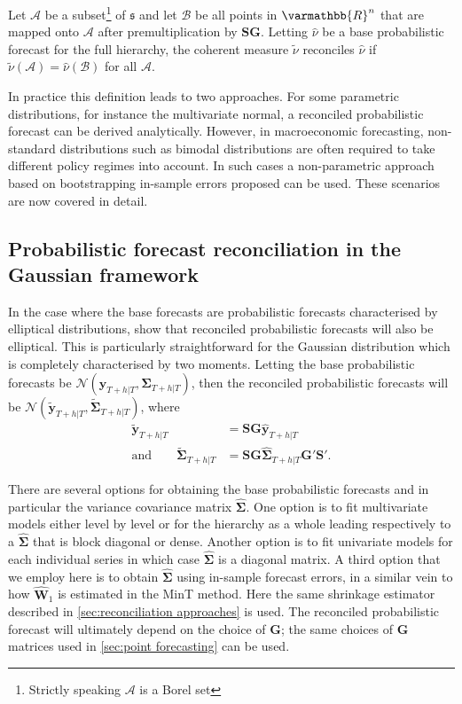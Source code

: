 {\begin{definition} Let $\mathcal{A}$ be a subset\footnote{Strictly speaking $\mathcal{A}$ is a Borel set} of $\mathfrak{s}$ and let $\mathcal{B}$ be all points in $\varmathbb{R}^n$ that are mapped onto $\mathcal{A}$ after premultiplication by $\bm{S}\bm{G}$. Letting $\hat{\nu}$ be a base probabilistic forecast for the full hierarchy, the coherent measure $\tilde{\nu}$ reconciles $\hat{\nu}$ if $\tilde{\nu}(\mathcal{A})=\hat{\nu}(\mathcal{B})$ for all $\mathcal{A}$.
\end{definition}

In practice this definition leads to two approaches. For some parametric distributions, for instance the multivariate normal, a reconciled probabilistic forecast can be derived analytically. However, in macroeconomic forecasting, non-standard distributions such as bimodal distributions are often required to take different policy regimes into account. In such cases a non-parametric approach based on bootstrapping in-sample errors proposed \citet{GamEtAl2018} can be used. These scenarios are now covered in detail.

\subsection{Probabilistic forecast reconciliation in the Gaussian framework}\label{sec:probrecgauss}

In the case where the base forecasts are probabilistic forecasts characterised by elliptical distributions, \citet{GamEtAl2018} show that reconciled probabilistic forecasts will also be elliptical. This is particularly straightforward for the Gaussian distribution which is completely characterised by two moments. Letting the base probabilistic forecasts be $\mathscr{N}(\bm{\hat{y}}_{T+h|T}, \hat{\bm{\Sigma}}_{T+h|T})$, then the reconciled probabilistic forecasts will be $\mathscr{N}(\bm{\tilde{y}}_{T+h|T}, \tilde{\bm{\Sigma}}_{T+h|T})$, where
\begin{align}\label{eq:rec mean}
	\bm{\tilde{y}}_{T+h|T} &= \bm{S}\bm{G}\bm{\hat{y}}_{T+h|T} \\
\text{and}\qquad\label{eq:rec var}
	\tilde{\bm{\Sigma}}_{T+h|T} &= \bm{S}\bm{G}\hat{\bm{\Sigma}}_{T+h|T}\bm{G}'\bm{S}'.
\end{align}

There are several options for obtaining the base probabilistic forecasts and in particular the variance covariance matrix $\hat{\bm{\Sigma}}$. One option is to fit multivariate models either level by level or for the hierarchy as a whole leading respectively to a $\hat{\bm \Sigma}$ that is block diagonal or dense. Another option is to fit univariate models for each individual series in which case $\hat{\bm{\Sigma}}$ is a diagonal matrix. A third option that we employ here is to obtain $\hat{\bm{\Sigma}}$ using in-sample forecast errors, in a similar vein to how $\hat{\bm{W}}_{1}$ is estimated in the MinT method. Here the same shrinkage estimator described in \ref{sec:reconciliation approaches} is used. The reconciled probabilistic forecast will ultimately depend on the choice of $\bm{G}$; the same choices of $\bm{G}$ matrices used in \ref{sec:point forecasting} can be used.

}

